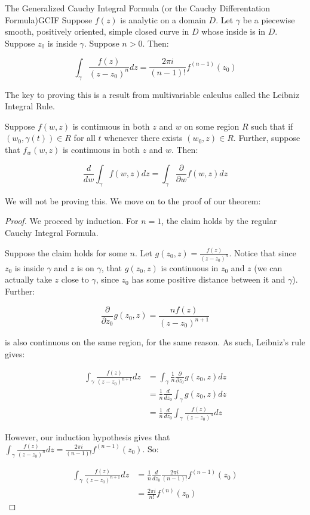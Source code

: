 \begin{thmbo}{The Generalized Cauchy Integral Formula (or the Cauchy Differentation Formula)}{GCIF}
Suppose $f(z)$ is analytic on a domain $D$. Let $\gamma$ be a piecewise smooth, positively oriented, simple closed curve in $D$ whose inside is in $D$. Suppose $z_0$ is inside $\gamma$. Suppose $n > 0$. Then:

$$\int_{\gamma} \frac{f(z)}{(z-z_0)^n}dz = \frac{2\pi i}{(n-1)!}f^{(n-1)}(z_0)$$
\end{thmbo}

The key to proving this is a result from multivariable calculus called the Leibniz Integral Rule.

\begin{lem} Suppose $f(w,z)$ is continuous in both $z$ and $w$ on some region $R$ such that if $(w_0,\gamma(t)) \in R$ for all $t$ whenever there exists $(w_0,z)\in R$. Further, suppose that $f_w(w,z)$ is continuous in both $z$ and $w$. Then:

$$\frac{d}{dw} \int_{\gamma} f(w,z)dz = \int_{\gamma} \frac{\partial}{\partial w} f(w,z)dz$$
\end{lem}

We will not be proving this. We move on to the proof of our theorem:

\begin{proof} We proceed by induction. For $n = 1$, the claim holds by the regular Cauchy Integral Formula.

Suppose the claim holds for some $n$. Let $g(z_0,z) = \frac{f(z)}{(z-z_0)^n}$. Notice that since $z_0$ is inside $\gamma$ and $z$ is on $\gamma$, that $g(z_0,z)$ is continuous in $z_0$ and $z$ (we can actually take $z$ close to $\gamma$, since $z_0$ has some positive distance between it and $\gamma$). Further:

$$\frac{\partial}{\partial z_0} g(z_0,z) = \frac{nf(z)}{(z-z_0)^{n+1}}$$

\noin is also continuous on the same region, for the same reason. As such, Leibniz's rule gives:

\begin{align*}\int_{\gamma} \frac{f(z)}{(z-z_0)^{n+1}}dz &= \int_{\gamma} \frac{1}{n} \frac{\partial}{\partial z_0} g(z_0,z) dz\\
&= \frac{1}{n}\frac{d}{dz_0}\int_{\gamma} g(z_0,z)dz\\
&= \frac{1}{n} \frac{d}{dz_0}\int_{\gamma} \frac{f(z)}{(z-z_0)^n}dz
\end{align*}

However, our induction hypothesis gives that $\int_{\gamma} \frac{f(z)}{(z-z_0)^n}dz = \frac{2\pi i}{(n-1)!}f^{(n-1)}(z_0)$. So:

\begin{align*}\int_{\gamma} \frac{f(z)}{(z-z_0)^{n+1}}dz &= \frac{1}{n}\frac{d}{dz_0}\frac{2\pi i}{(n-1)!}f^{(n-1)}(z_0)\\
&= \frac{2\pi i}{n!}f^{(n)}(z_0)
\end{align*}

\end{proof}

